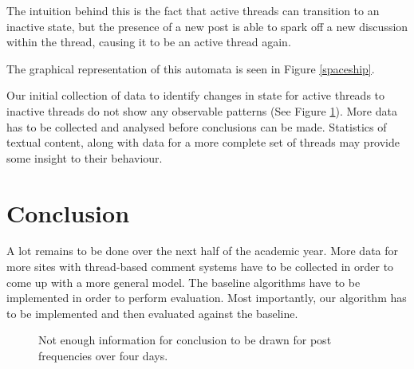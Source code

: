 \documentclass[12 pt]{article}
\begin{document}
The intuition behind this is the fact that active threads can transition to an inactive state, but the presence of a new post is able to spark off a new discussion within the thread, causing it to be an active thread again.

The graphical representation of this automata is seen in Figure \ref{spaceship}.


Our initial collection of data to identify changes in state for active threads to inactive threads do not show any observable patterns (See Figure \ref{nothing}). More data has to be collected and analysed before conclusions can be made. Statistics of textual content, along with data for a more complete set of threads may provide some insight to their behaviour.

\section{Conclusion}
A lot remains to be done over the next half of the academic year. More data for more sites with thread-based comment systems have to be collected in order to come up with a more general model. The baseline algorithms have to be implemented in order to perform evaluation. Most importantly, our algorithm has to be implemented and then evaluated against the baseline.


\begin{figure}[h]
	\caption{Not enough information for conclusion to be drawn for post frequencies over four days.}\label{nothing}

\end{figure}







\end{document}
